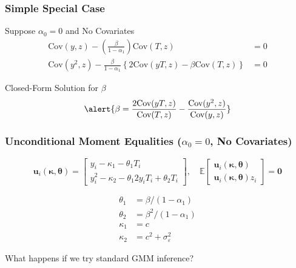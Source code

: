 \documentclass{beamer}
\begin{document}
%
\begin{frame}
  \frametitle{Simple Special Case}


  \begin{block}{Suppose $\alpha_0 = 0$ and No Covariates}
  \begin{align*}
    \mbox{Cov}(y,z) - \left( \frac{\beta}{1 - \alpha_1} \right) \mbox{Cov}(T,z) &= 0\\
      \mbox{Cov}(y^2,z) - \frac{\beta}{1 - \alpha_1}\left\{2\mbox{Cov}(yT,z)- \beta \mbox{Cov}(T,z)\right\} &= 0
  \end{align*}
  \end{block}

  \begin{block}{Closed-Form Solution for $\beta$}
  \[
    \alert{\beta = \frac{2\mbox{Cov}(yT,z)}{\mbox{Cov}(T,z)} - \frac{\mbox{Cov}(y^2,z)}{\mbox{Cov}(y,z)}}
  \]
  \end{block}

\end{frame}
\begin{frame}
  \frametitle{Unconditional Moment Equalities ($\alpha_0 = 0$, No Covariates)}

\[
  \mathbf{u}_i(\boldsymbol{\kappa}, \boldsymbol{\theta}) = \left[
  \begin{array}{l}
  y_i - \kappa_1 - \theta_1 T_i\\
  y^2_i - \kappa_2  - \theta_1 2y_iT_i + \theta_2 T_i
  \end{array}
\right], \quad
 \mathbb{E}
  \left[
  \begin{array}{l}
    \boldsymbol{u}_i(\boldsymbol{\kappa}, \boldsymbol{\theta}) \\ \mathbf{u}_i(\boldsymbol{\kappa}, \boldsymbol{\theta}) z_i
  \end{array}
\right] = \mathbf{0}
\]

\small
\begin{align*}
    \theta_1 &= \beta / (1 - \alpha_1)\\
    \theta_2 &= \beta^2 / (1 - \alpha_1)\\
    \kappa_1 &= c\\
    \kappa_2 &= c^2 + \sigma_{\varepsilon}^2
  \end{align*}

  \alert{What happens if we try standard GMM inference?}

\end{frame}
\end{document}
